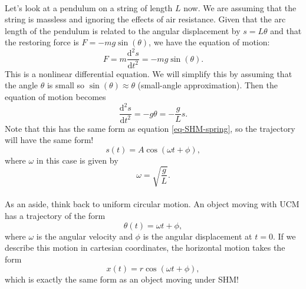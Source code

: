 \documentclass[../classical_mechanics.tex]{subfiles}
\begin{document}
        \paragraph{}
        Let's look at a pendulum on a string of length $L$ now.
        We are assuming that the string is massless and ignoring the effects of air resistance.
        Given that the arc length of the pendulum is related to the angular displacement by $s=L\theta$ and that the restoring force is $F=-mg\sin(\theta)$, we have the equation of motion:
        \begin{equation}
            F=m\frac{\mathrm{d}^2s}{\mathrm{d}t^2}=-mg\sin(\theta).
        \end{equation}
        This is a nonlinear differential equation. We will simplify this by assuming that the angle $\theta$ is small so $\sin(\theta)\approx\theta$ (small-angle approximation).
        Then the equation of motion becomes
        \begin{equation}
            \frac{\mathrm{d}^2s}{\mathrm{d}t^2}=-g\theta=-\frac{g}{L}s.
        \end{equation}
        Note that this has the same form as equation \ref{eq-SHM-spring}, so the trajectory will have the same form!
        \begin{equation}
            s(t)=A\cos(\omega t+\phi),
        \end{equation}
        where $\omega$ in this case is given by
        \begin{equation}
            \omega = \sqrt{\frac{g}{L}}.
        \end{equation}

        \paragraph{}
        As an aside, think back to uniform circular motion.
        An object moving with UCM has a trajectory of the form
        \begin{equation}
            \theta(t)=\omega t+\phi,
        \end{equation}
        where $\omega$ is the angular velocity and $\phi$ is the angular displacement at $t=0$.
        If we describe this motion in cartesian coordinates, the horizontal motion takes the form
        \begin{equation}
            x(t) = r\cos(\omega t+\phi),
        \end{equation}
        which is exactly the same form as an object moving under SHM!
\end{document}
